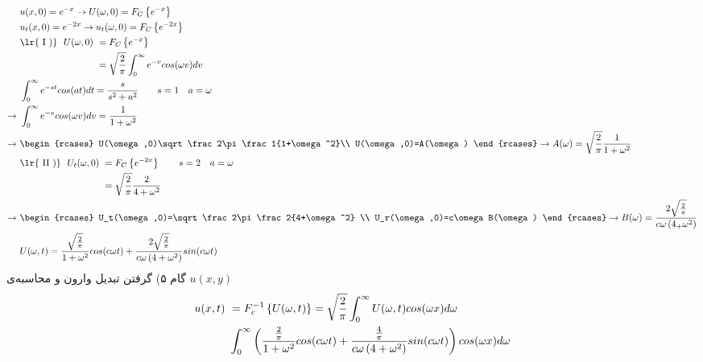 \begin{equation*}
	\begin{aligned}
		&\
		u(x,0)=e^{-x}\rightarrow U(\omega,0)=F_C\left\{e^{-x}\right\}
		\\ &\
		u_t(x,0)=e^{-2x}\rightarrow u_t(\omega,0)=F_C\left\{e^{-2x}\right\}
		\\ &\
		\begin{aligned}
			\text{\lr{\RN{1})}}\ \ U(\omega,0) &\ =F_C\left\{e^{-x}\right\}
			\\ &\
			=\sqrt\frac2\pi \int_0^\infty e^{-v}cos(\omega v)dv
		\end{aligned}
	\\&\
	\int_0^\infty e^{-st}cos(at)dt=\frac s{s^2+a^2}\qquad s=1 \quad a=\omega
	\\
	\rightarrow &\
	\int_0^\infty e^{-v}cos(\omega v)dv=\frac1{1+\omega^2}
	\\
	\rightarrow &\
	\begin{rcases}
		U(\omega,0)\sqrt\frac2\pi\frac1{1+\omega^2}\\
		U(\omega,0)=A(\omega)
	\end{rcases}
	\rightarrow A(\omega)=\sqrt\frac2\pi\frac1{1+\omega^2}
	\\ &\
	\begin{aligned}
		\text{\lr{\RN2)}}\ \ U_t(\omega,0) &\
		= F_C\left\{e^{-2x}\right\}\qquad s=2\quad a=\omega
		\\ &\
		= \sqrt\frac2\pi\frac2{4+\omega^2}
	\end{aligned}
	\\ \rightarrow &\
	\begin{rcases}
	U_t(\omega,0)=\sqrt\frac2\pi\frac2{4+\omega^2}
	\\
	U_r(\omega,0)=c\omega B(\omega)
	\end{rcases}
	\rightarrow B(\omega)=\frac{2\sqrt\frac2\pi}{c\omega\pr{4_+\omega^2}}
	\\ &\
	U(\omega,t)=\frac{\sqrt\frac2\pi}{1+\omega^2}cos(c\omega t)+\frac{2\sqrt\frac2\pi}{c\omega\pr{4+\omega^2}}sin(c\omega t)
	\end{aligned}
\end{equation*}
گام ۵) گرفتن تبدیل وارون و محاسبه‌ی
$u(x,y)$
\begin{equation*}
	\begin{aligned}
		u(x,t) &\ = F_c^{-1}\left\{U(\omega,t)\right\}=\sqrt\frac2\pi\int_0^\infty U(\omega,t)cos(\omega x)d\omega
		\\ &\
		\int_0^\infty \left(\frac{\frac2\pi}{1+\omega^2}cos(c\omega t)+\frac{\frac4\pi}{c\omega\left(4+\omega^2\right)}sin(c\omega t)\right)cos(\omega x)d\omega
	\end{aligned}
\end{equation*}
